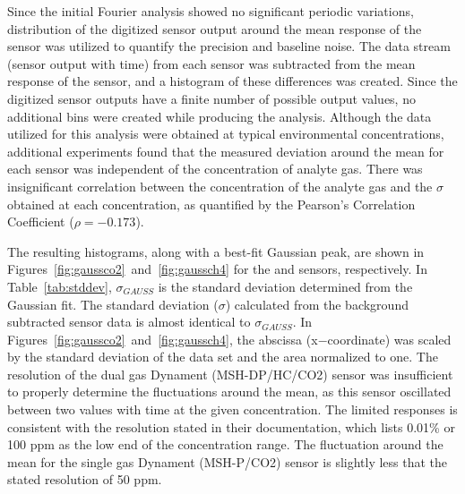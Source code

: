 \documentclass[sensors,article,submit,moreauthors,pdftex]{Definitions/mdpi}
\begin{document}
			Since the initial Fourier analysis showed no significant periodic variations, distribution of the digitized sensor output around the mean response of the sensor was utilized to quantify the precision and baseline noise.
			The data stream (sensor output with time) from each sensor was subtracted from the mean response of the sensor, and a histogram of these differences was created.
			Since the digitized sensor outputs have a finite number of possible output values, no additional bins were created while producing the analysis.
			Although the data utilized for this analysis were obtained at typical environmental concentrations, additional experiments found that the measured deviation around the mean for each sensor was independent of the concentration of analyte gas.
			There was insignificant correlation between the concentration of the analyte gas and the $\sigma$ obtained at each concentration, as quantified by the Pearson's Correlation Coefficient ($\rho=-0.173$).
			

			The resulting histograms, along with a best-fit Gaussian peak, are shown in Figures~\ref{fig:gaussco2}~and~\ref{fig:gaussch4} for the  and  sensors, respectively.
			In Table~\ref{tab:stddev}, $\sigma_{GAUSS}$ is the standard deviation determined from the Gaussian fit.
			The standard deviation ($\sigma$) calculated from the background subtracted sensor data is almost identical to $\sigma_{GAUSS}$.
			In Figures~\ref{fig:gaussco2}~and~\ref{fig:gaussch4}, the abscissa (x$-$coordinate) was scaled by the standard deviation of the data set and the area normalized to one.
			The resolution of the dual gas Dynament (MSH-DP/HC/CO2) sensor was insufficient to properly determine the fluctuations around the mean, as this sensor oscillated between two values with time at the given concentration.
			The limited responses is consistent with the resolution stated in their documentation, which lists 0.01\% or 100 ppm as the low end of the concentration range.
			The fluctuation around the mean for the single gas Dynament (MSH-P/CO2) sensor is slightly less that the stated resolution of 50 ppm.
			
\end{document}

